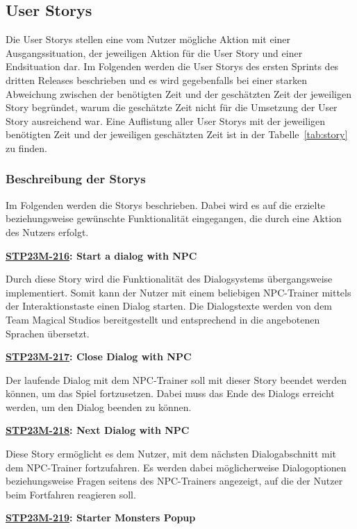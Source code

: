 \subsection{User Storys}
Die User Storys stellen eine vom Nutzer mögliche Aktion mit einer Ausgangssituation, der jeweiligen Aktion für die User Story und einer Endsituation dar. Im Folgenden werden die User Storys des ersten Sprints des dritten Releases beschrieben und es wird gegebenfalls bei einer starken Abweichung zwischen der benötigten Zeit und der geschätzten Zeit der jeweiligen Story begründet, warum die geschätzte Zeit nicht für die Umsetzung der User Story ausreichend war. Eine Auflistung aller User Storys mit der jeweiligen benötigten Zeit und der jeweiligen geschätzten Zeit ist in der Tabelle~\ref{tab:story} zu finden. 
\subsubsection{Beschreibung der Storys}

Im Folgenden werden die Storys beschrieben. Dabei wird es auf die erzielte beziehungsweise gewünschte Funktionalität eingegangen, die durch eine Aktion des Nutzers erfolgt.

\textbf{\hyperlink{T216}{\hypertarget{S216}{STP23M-216}}: Start a dialog with NPC}

Durch diese Story wird die Funktionalität des Dialogsystems übergangsweise implementiert. Somit kann der Nutzer mit einem beliebigen NPC-Trainer mittels der Interaktionstaste einen Dialog starten. Die Dialogstexte werden von dem Team Magical Studios bereitgestellt und entsprechend in die angebotenen Sprachen übersetzt.

\textbf{\hyperlink{T217}{\hypertarget{S217}{STP23M-217}}: Close Dialog with NPC}

Der laufende Dialog mit dem NPC-Trainer soll mit dieser Story beendet werden können, um das Spiel fortzusetzen. Dabei muss das Ende des Dialogs erreicht werden, um den Dialog beenden zu können. 

\textbf{\hyperlink{T218}{\hypertarget{S218}{STP23M-218}}: Next Dialog with NPC}

Diese Story ermöglicht es dem Nutzer, mit dem nächsten Dialogabschnitt mit dem NPC-Trainer fortzufahren. Es werden dabei möglicherweise Dialogoptionen beziehungsweise Fragen seitens des NPC-Trainers angezeigt, auf die der Nutzer beim Fortfahren reagieren soll.

\textbf{\hyperlink{T219}{\hypertarget{S219}{STP23M-219}}: Starter Monsters Popup}

